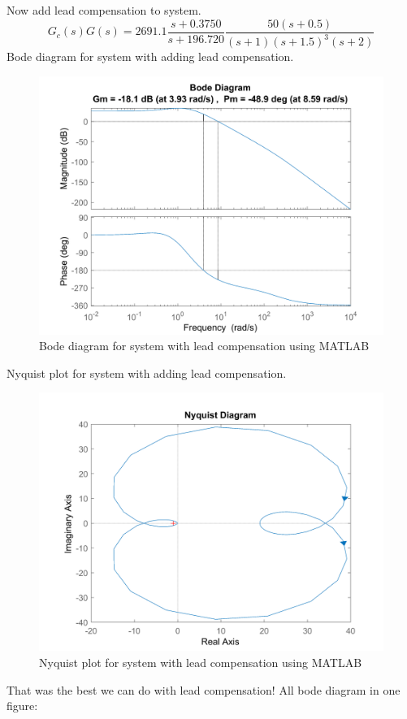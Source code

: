 Now add lead compensation to system.
$$
G_c(s)G(s) = 2691.1\dfrac{s + 0.3750}{s + 196.720} \dfrac{50(s+0.5)}{(s+1)(s+1.5)^{3}(s+2)}
$$
Bode diagram for system with adding lead compensation.
\begin{figure}[H]
	\caption{Bode diagram for system with lead compensation using MATLAB}
	\centering
	\label{margin with one lead}
	\includegraphics[width=12cm]{../Figure/Q1/a/new_margin.png}
\end{figure}
Nyquist plot for system with adding lead compensation.
\begin{figure}[H]
	\caption{Nyquist plot for system with lead compensation using MATLAB}
	\centering
	\includegraphics[width=12cm]{../Figure/Q1/a/new_nyquist.png}
\end{figure}
That was the best we can do with lead compensation!
All bode diagram in one figure:
